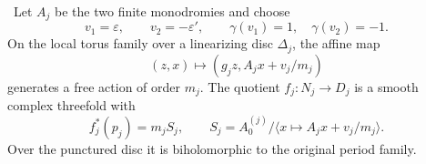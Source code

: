 \begin{proposition}
\label{wb:prop:candidate-finite-fillings}
\ Let \(A_j\) be the two finite monodromies and choose
\[
 v_1=\varepsilon,\qquad v_2=-\varepsilon',
 \qquad \gamma(v_1)=1,\quad\gamma(v_2)=-1.
\]
On the local torus family over a linearizing disc \(\Delta_j\), the affine
map
\[
 (z,x)\longmapsto(g_jz,A_jx+v_j/m_j)
\tag{2.9}
\]
generates a free action of order \(m_j\).  The quotient
\(f_j:N_j\to D_j\) is a smooth complex threefold with
\[
 f_j^*(p_j)=m_jS_j,\qquad
 S_j=A_0^{(j)}/\langle x\mapsto A_jx+v_j/m_j\rangle.
\tag{2.10}
\]
Over the punctured disc it is biholomorphic to the original period family.
\end{proposition}

